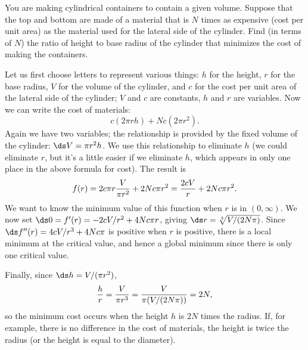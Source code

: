 \begin{example}
You are making cylindrical containers to contain a given volume.  Suppose
that the top and bottom are made of a material that is $N$ times as
expensive (cost per unit area) as the material used for the lateral side of
the cylinder.  Find (in terms of $N$) the ratio of height to base radius of
the cylinder that minimizes the cost of making the containers.

Let us first choose letters to represent various things: $h$ for the
height, $r$ for the base radius, $V$ for the volume of the
cylinder, and $c$ for the cost per unit area of the lateral side of
the cylinder; $V$ and $c$ are constants, $h$ and $r$ are variables.
Now we can write the cost of materials:
$$
  c(2\pi rh)+Nc(2\pi r^2).
$$
Again we have two variables; the relationship is provided by the fixed
volume of the cylinder: $\ds V=\pi r^2h$. We use this
relationship to eliminate $h$ (we could eliminate $r$, but it's a little easier
if we eliminate $h$, which appears in only one place in the above formula
for cost).  The result is
$$
   f(r)=2c\pi r{V\over\pi r^2}+2Nc\pi r^2={2cV\over r}+2Nc\pi r^2.
$$
We want to know the minimum value of this function when $r$ is in
$(0,\infty)$. 
We now set $\ds 0=f'(r)=-2cV/r^2+4Nc\pi
r$, giving $\ds r={\root 3 \of {V/(2N\pi)}}$.  
Since $\ds f''(r)=4cV/r^3+4Nc\pi$ is positive when $r$ is positive, there
is a local minimum at the critical value, and hence a global minimum
since there is only one critical value.

Finally, since $\ds h=V/(\pi r^2)$, 
$$
{h\over r}={V\over\pi r^3}={V\over \pi(V/(2N\pi))}=2N,
$$ 
so the minimum cost occurs when the height $h$ is $2N$ times the
radius. If, for example, there is no difference in the cost of
materials, the height is twice the radius (or the height is equal to
the diameter).
\end{example}


